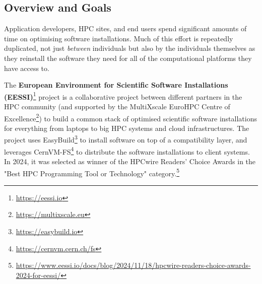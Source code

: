 

\subsection*{Overview and Goals}

Application developers, HPC sites, and end users %
spend significant amounts of time on optimising software installations.
Much of this effort is repeatedly duplicated, not just \emph{between}
individuals but also by the individuals themselves as they reinstall
the software they need for all of the computational platforms they have access to. 

The \textbf{European Environment for Scientific Software Installations (EESSI)}\footnote{\href{https://eessi.io}{https://eessi.io}}
project is a collaborative project
between different partners in the HPC community (and supported by the MultiXscale EuroHPC Centre of
Excellence\footnote{\href{https://multixscale.eu}{https://multixscale.eu}}) to build a
common stack of optimised scientific software installations for everything from laptops to big HPC systems and cloud
infrastructures. The project uses EasyBuild\footnote{\href{https://easybuild.io}{https://easybuild.io}} to install
software on top of a compatibility layer, and leverages CernVM-FS\footnote{\href{https://cernvm.cern.ch/fs}{https://cernvm.cern.ch/fs}} to
distribute the software installations to client systems. In 2024, it was selected as winner of the HPCwire Readers’ Choice Awards
in the "Best HPC Programming Tool or Technology"
category.\footnote{\href{https://www.eessi.io/docs/blog/2024/11/18/hpcwire-readers-choice-awards-2024-for-eessi/}{https://www.eessi.io/docs/blog/2024/11/18/hpcwire-readers-choice-awards-2024-for-eessi/}}

